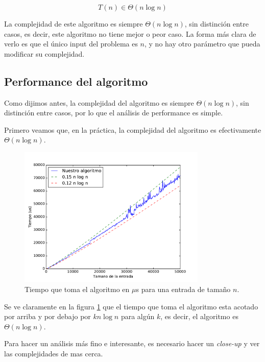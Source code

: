 \[T(n) \in \Theta(n \log n)\]

La complejidad de este algoritmo es siempre $\Theta(n \log n)$, sin distinción entre casos, es decir, este algoritmo no tiene mejor o peor caso. La forma más clara de verlo es que el único input del problema es $n$, y no hay otro parámetro que pueda modificar su complejidad.

\subsection{Performance del algoritmo}

Como dijimos antes, la complejidad del algoritmo es siempre $\Theta(n \log n)$, sin distinción entre casos, por lo que el análisis de performance es simple.

Primero veamos que, en la práctica, la complejidad del algoritmo es efectivamente $\Theta(n \log n)$.

\begin{figure}[H]
 \centering
	\includegraphics[width=0.8\textwidth]{img/tiempos/kaioken3.pdf}
	\caption{\footnotesize Tiempo que toma el algoritmo en $\mu$s para una entrada de tamaño $n$.}
	\label{fig:kaioken-tiempos3}
\end{figure}

Se ve claramente en la figura \ref{fig:kaioken-tiempos3} que el tiempo que toma el algoritmo esta acotado por arriba y por debajo por $k n \log n$ para algún $k$, es decir, el algoritmo es $\Theta(n \log n)$.

Para hacer un análisis más fino e interesante, es necesario hacer un \emph{close-up} y ver las complejidades de mas cerca.

